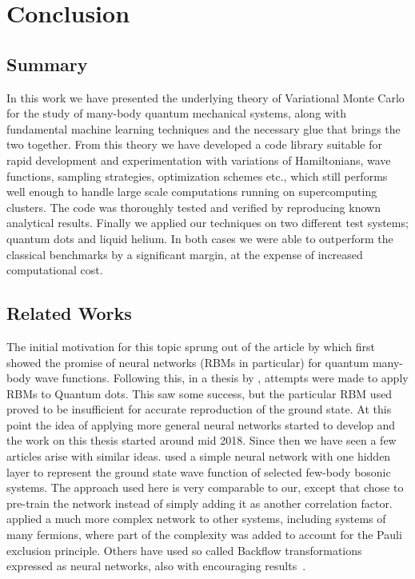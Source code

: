 \documentclass[Thesis.tex]{subfiles}
\begin{document}
\chapter{Conclusion}
\label{chp:conclusion}

\section{Summary}

In this work we have presented the underlying theory of Variational
Monte Carlo for the study of many-body quantum mechanical systems, along
with fundamental machine learning techniques and the necessary glue that
brings the two together. From this theory we have developed a code
library suitable for rapid development and experimentation with
variations of Hamiltonians, wave functions, sampling strategies,
optimization schemes etc., which still performs well enough to
handle large scale computations running on supercomputing clusters. The
code was thoroughly tested and verified by reproducing known analytical
results. Finally we applied our techniques on two different test
systems; quantum dots and liquid helium. In both cases we were able to
outperform the classical benchmarks by a significant margin, at the
expense of increased computational cost.


\section{Related Works}

The initial motivation for this topic sprung out of the article by
\textcite{Carleo602} which first showed the promise of neural networks (RBMs in
particular) for quantum many-body wave functions. Following this, in a thesis by
\textcite{Flugsrud-2018}, attempts were made to apply RBMs to Quantum dots. This
saw some success, but the particular RBM used proved to be insufficient for
accurate reproduction of the ground state. At this point the idea of applying
more general neural networks started to develop and the work on this thesis
started around mid 2018. Since then we have seen a few articles arise with
similar ideas. \textcite{Saito-2018} used a simple neural network with one
hidden layer to represent the ground state wave function of 
selected few-body bosonic systems. The approach used here is very comparable to our,
except that \citeauthor{Saito-2018} chose to pre-train the network instead of
simply adding it as another correlation factor. \textcite{Han-2018} applied a
much more complex network to other systems, including systems of many fermions,
where part of the complexity was added to account for the Pauli exclusion
principle. Others have used so called Backflow transformations expressed as
neural networks, also with encouraging results~\cite{ruggeri2018,Luo-2019}.
\end{document}
